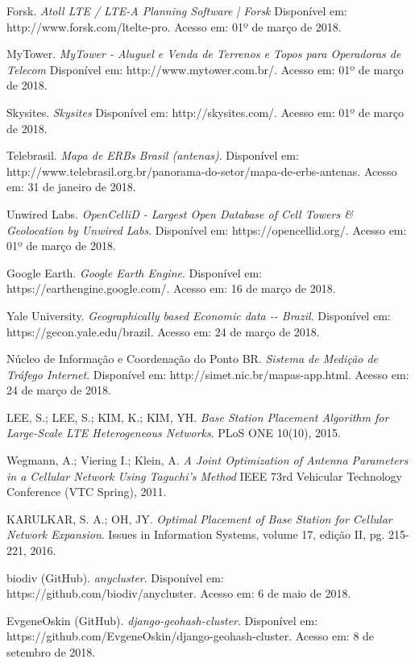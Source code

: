 \documentclass[]{politex}
\begin{document}
\begin{thebibliography}{9}
    
    Forsk.
    \textit{Atoll LTE / LTE-A Planning Software | Forsk}
    Disponível em: http://www.forsk.com/ltelte-pro.
    Acesso em: 01º de março de 2018.

    MyTower.
    \textit{MyTower - Aluguel e Venda de Terrenos e Topos para
    Operadoras de Telecom}
    Disponível em: http://www.mytower.com.br/.
    Acesso em: 01º de março de 2018.

    Skysites.
    \textit{Skysites}
    Disponível em: http://skysites.com/.
    Acesso em: 01º de março de 2018.

    Telebrasil.
    \textit{Mapa de ERBs Brasil (antenas)}.
    Disponível em:
    http://www.telebrasil.org.br/panorama-do-setor/mapa-de-erbs-antenas.
    Acesso em: 31 de janeiro de 2018.

    Unwired Labs.
    \textit{OpenCelliD - Largest Open Database of Cell Towers \&
    Geolocation by Unwired Labs}.
    Disponível em: https://opencellid.org/.
    Acesso em: 01º de março de 2018.

    Google Earth.
    \textit{Google Earth Engine}.
    Disponível em: https://earthengine.google.com/.
    Acesso em: 16 de março de 2018.

    Yale University.
    \textit{Geographically based Economic data -{}- Brazil}.
    Disponível em: https://gecon.yale.edu/brazil.
    Acesso em: 24 de março de 2018.

    Núcleo de Informação e Coordenação do Ponto BR.
    \textit{Sistema de Medição de Tráfego Internet}.
    Disponível em: http://simet.nic.br/mapas-app.html.
    Acesso em: 24 de março de 2018.

    LEE, S.; LEE, S.; KIM, K.; KIM, YH.
    \textit{Base Station Placement Algorithm for Large-Scale LTE
    Heterogeneous Networks}.
    PLoS ONE 10(10), 2015.

    Wegmann, A.; Viering I.; Klein, A.
    \textit{A Joint Optimization of Antenna Parameters in a
    Cellular Network Using Taguchi’s Method}
    IEEE 73rd Vehicular Technology Conference (VTC Spring), 2011.

    KARULKAR, S. A.; OH, JY.
    \textit{Optimal Placement of Base Station for Cellular Network Expansion}.
    Issues in Information Systems, volume 17, edição II, pg. 215-221, 2016.

    biodiv (GitHub).
    \textit{anycluster}.
    Disponível em: https://github.com/biodiv/anycluster.
    Acesso em: 6 de maio de 2018.

    EvgeneOskin (GitHub).
    \textit{django-geohash-cluster}.
    Disponível em: https://github.com/EvgeneOskin/django-geohash-cluster.
    Acesso em: 8 de setembro de 2018.

\end{thebibliography}
\apendice


\anexo
\end{document}

